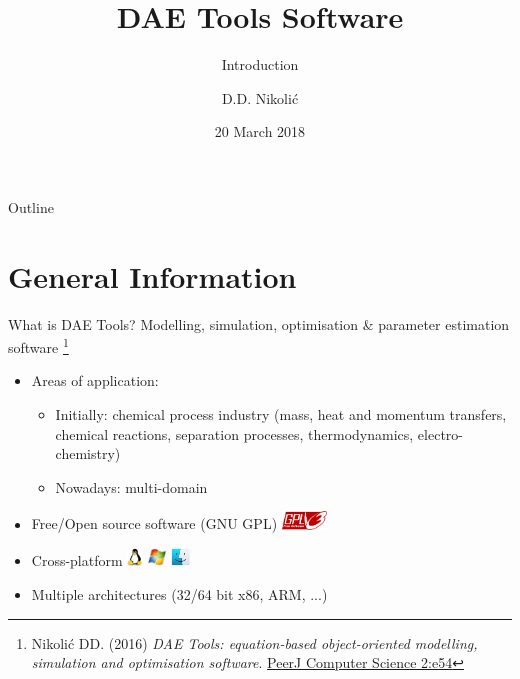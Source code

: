 \documentclass[compress,newPxFont,sthlmFooter]{beamer}
\title{DAE Tools Software}
\subtitle{Introduction}
\author{D.D. Nikolić}
\institute
{
  DAE Tools Project, \url{http://www.daetools.com}
}
\date{20 March 2018}
\begin{document}
\maketitle

\begin{frame}{Outline}
\tableofcontents[sectionstyle=show, 
                 subsectionstyle=hide]
\end{frame} 

\section{General Information}

\begin{frame}{What is DAE Tools?} 
\alert{Modelling}, \alert{simulation}, \alert{optimisation} \& \alert{parameter estimation} software
\footnote{\tiny{Nikolić DD. (2016) \textit{DAE Tools: equation-based object-oriented modelling, simulation and optimisation software}.
          \href{https://doi.org/10.7717/peerj-cs.54}{PeerJ Computer Science 2:e54}}
         }

\begin{itemize}
  \item Areas of application:
    \begin{itemize}
      \item Initially: \alert{chemical process industry} (mass, heat and momentum transfers, chemical reactions, 
                                                          separation processes, thermodynamics, electro-chemistry)
      \item Nowadays: \alert{multi-domain}
    \end{itemize}
  \item \alert{Free/Open source software} (GNU GPL) \includegraphics[align=c,height=1.3em]{gnu_gpl3.png}
  \item \alert{Cross-platform} \includegraphics[align=c,height=1.3em]{linux.png} 
                               \includegraphics[align=c,height=1.3em]{windows.png} 
                               \includegraphics[align=c,height=1.3em]{macos.png}
  \item \alert{Multiple architectures} (32/64 bit x86, ARM, ...)
\end{itemize}
\end{frame}
\end{document}
